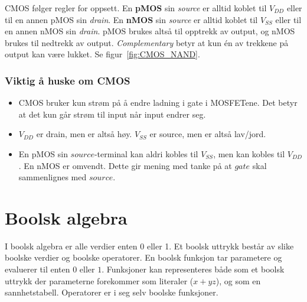 \documentclass[12pt,a4paper,norsk]{article}
\begin{document}
%
CMOS følger regler for oppsett. En \textbf{pMOS} sin \textit{source} er alltid
koblet til $V_{DD}$ eller til en annen pMOS sin \textit{drain}. En \textbf{nMOS}
sin \textit{source} er alltid koblet til $V_{SS}$ eller til en annen nMOS sin
\textit{drain}\@. pMOS brukes altså til opptrekk av output, og nMOS brukes til
nedtrekk av output. \textit{Complementary} betyr at kun én av trekkene på output
kan være lukket. Se figur~\ref{fig:CMOS_NAND}.
%
\subsubsection{Viktig å huske om CMOS}
\begin{itemize}
  \item CMOS bruker kun strøm på å endre ladning i gate i MOSFETene. Det betyr at det
    kun går strøm til input når input endrer seg.
  \item $V_{DD}$ er drain, men er altså høy. $V_{SS}$ er source, men er altså
    lav/jord.
    \item En pMOS sin $source$-terminal kan aldri kobles til $V_{SS}$, men kan
    kobles til $V_{DD}$. En nMOS er omvendt. Dette gir mening med tanke på at
    $gate$ skal sammenlignes med $source$.
\end{itemize}

\newcommand{\varkern}{\hspace{0.06em}}
\newcommand{\var}[1]{\varkern#1\varkern}
\newcommand{\kom}[1]{\varkern\bar{#1}\varkern}
\newcommand{\xor}{\oplus}
\newcommand{\xnor}{\odot}

\section{Boolsk algebra}\label{sec:bool_alg}
I boolsk algebra er alle verdier enten 0 eller 1. Et boolsk uttrykk består av
slike boolske verdier og boolske operatorer. En boolsk funksjon tar parametere
og evaluerer til enten $0$ eller $1$. Funksjoner kan representeres både som et
boolsk uttrykk der parameterne forekommer som literaler ($x+yz$), og
som en sannhetstabell. Operatorer er i seg selv boolske funksjoner.
\end{document}
